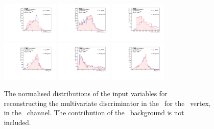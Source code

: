 \begin{figure}[htbp]
	\includegraphics[width=0.25\textwidth]{6_Search/Figures/PlotsTechnics/dRZcZcttoppairuuu_norm}
	\includegraphics[width=0.25\textwidth]{6_Search/Figures/PlotsTechnics/dRSMjetLightjetZcttoppairuuu_norm}
	\includegraphics[width=0.25\textwidth]{6_Search/Figures/PlotsTechnics/TotalInvMassZcttoppairuuu_norm}
	\includegraphics[width=0.25\textwidth]{6_Search/Figures/PlotsTechnics/dRZWlepZcttoppairuuu_norm}
	\includegraphics[width=0.25\textwidth]{6_Search/Figures/PlotsTechnics/Bdis_LightjetZcttoppairuuu_norm}
	\includegraphics[width=0.25\textwidth]{6_Search/Figures/PlotsTechnics/dRZbZcttoppairuuu_norm}
	\caption{The normalised distributions of the input variables for reconstructing the multivariate discriminator in the \TTSR\ for the \Zct\ vertex, in the \mumumu\ channel.  The contribution of the \NPL\ background is not included.}
	\label{fig:toppairZctnormalized}
\end{figure}

